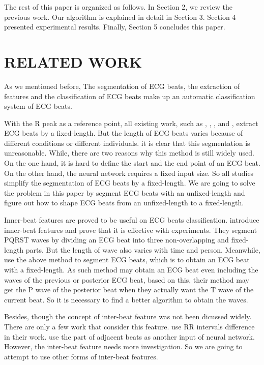 \documentclass[wcp]{jmlr}
\begin{document}
  
The rest of this paper is organized as follows. In Section 2, we review the previous work. Our algorithm is explained in detail in Section 3. Section 4 presented experimental results. Finally, Section 5 concludes this paper.
\section{RELATED WORK}
As we mentioned before, The segmentation of ECG beats, the extraction of features and the classification of ECG beats make up an automatic classification system of ECG beats.


With the R peak as a reference point, all existing work, such as \cite{ye2012combining}, \cite{kiranyaz2016real}, \cite{zubair2016automated}, \cite{salloum2017ecg} and \cite{ye2012heartbeat}, extract ECG beats by a fixed-length. But the length of ECG beats varies because of different conditions or different individuals. it is clear that this segmentation is unreasonable. While, there are two reasons why this method is still widely used. On the one hand, it is hard to define the start and the end point of an ECG beat. On the other hand, the neural network requires a fixed input size. So all studies simplify the segmentation of ECG beats by a fixed-length. We are going to solve the problem in this paper by segment ECG beats with an unfixed-length and figure out how to shape ECG beats from an unfixed-length to a fixed-length.


Inner-beat features are proved to be useful on ECG beats classification. \cite{xiang2018ecg} introduce inner-beat features and prove that it is effective with experiments. They segment PQRST waves by dividing an ECG beat into three non-overlapping and fixed-length parts. But the length of wave also varies with time and person. Meanwhile, \cite{xiang2018ecg} use the above method to segment ECG beats, which is to obtain an ECG beat with a fixed-length. As such method may obtain an ECG beat even including the waves of the previous or posterior ECG beat, based on this, their method may get the P wave of the posterior beat when they actually want the T wave of the current beat. So it is necessary to find a better algorithm to obtain the waves.

Besides, though the concept of inter-beat feature was not been dicussed widely. There are only a few work that consider this feature. \cite{xiang2018ecg} use RR intervals difference in their work. \cite{kiranyaz2016real} use the part of adjacent beats as another input of neural network. However, the inter-beat feature needs more investigation. So we are going to attempt to use other forms of inter-beat features.
\end{document}
